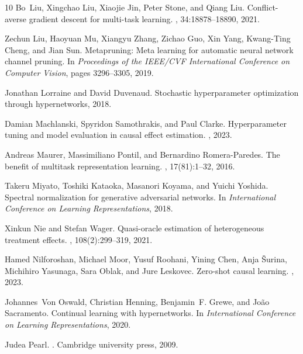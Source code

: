\documentclass{article}
\begin{document}
\begin{thebibliography}{10}
	Bo~Liu, Xingchao Liu, Xiaojie Jin, Peter Stone, and Qiang Liu.
	\newblock Conflict-averse gradient descent for multi-task learning.
	,
	34:18878--18890, 2021.
	
	Zechun Liu, Haoyuan Mu, Xiangyu Zhang, Zichao Guo, Xin Yang, Kwang-Ting Cheng,
	and Jian Sun.
	\newblock Metapruning: Meta learning for automatic neural network channel
	pruning.
	\newblock In {\em Proceedings of the IEEE/CVF International Conference on
		Computer Vision}, pages 3296--3305, 2019.
	
	Jonathan Lorraine and David Duvenaud.
	\newblock Stochastic hyperparameter optimization through hypernetworks, 2018.
	
	Damian Machlanski, Spyridon Samothrakis, and Paul Clarke.
	\newblock Hyperparameter tuning and model evaluation in causal effect
	estimation.
	, 2023.
	
	Andreas Maurer, Massimiliano Pontil, and Bernardino Romera-Paredes.
	\newblock The benefit of multitask representation learning.
	, 17(81):1--32, 2016.
	
	Takeru Miyato, Toshiki Kataoka, Masanori Koyama, and Yuichi Yoshida.
	\newblock Spectral normalization for generative adversarial networks.
	\newblock In {\em International Conference on Learning Representations}, 2018.
	
	Xinkun Nie and Stefan Wager.
	\newblock Quasi-oracle estimation of heterogeneous treatment effects.
	, 108(2):299--319, 2021.
	
	Hamed Nilforoshan, Michael Moor, Yusuf Roohani, Yining Chen, Anja {\v{S}}urina,
	Michihiro Yasunaga, Sara Oblak, and Jure Leskovec.
	\newblock Zero-shot causal learning.
	, 2023.
	
	Johannes~Von Oswald, Christian Henning, Benjamin~F. Grewe, and João
	Sacramento.
	\newblock Continual learning with hypernetworks.
	\newblock In {\em International Conference on Learning Representations}, 2020.
	
	Judea Pearl.
	.
	\newblock Cambridge university press, 2009.
	

\end{thebibliography}
\end{document}
